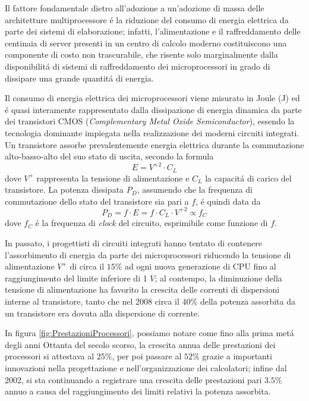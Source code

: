 Il fattore fondamentale dietro all'adozione a un'adozione di massa delle architetture multiprocessore \'e la riduzione del consumo di energia elettrica da parte dei sistemi di elaborazione; infatti, l'alimentazione e il raffreddamento delle centinaia di server presenti in un centro di calcolo moderno costituiscono una componente di costo non trascurabile, che risente solo marginalmente dalla disponibilit\'a di sistemi di raffreddamento dei microprocessori in grado di dissipare una grande quantit\'a di energia.\newline

Il consumo di energia elettrica dei microprocessori viene misurato in Joule (\si{J}) ed \'e quasi interamente rappresentato dalla dissipazione di energia dinamica da parte dei transistori CMOS (\textit{Complementary Metal Oxide Semiconductor}), essendo la tecnologia dominante impiegata nella realizzazione dei moderni circuiti integrati.
Un transistore assorbe prevalentemente energia elettrica durante la commutazione alto-basso-alto del suo stato di uscita, secondo la formula
$$
    E = V^{+2} \cdot C_{L}
$$
dove $V^{+}$ rappresenta la tensione di alimentazione e $C_{L}$ la capacit\'a di carico del transistore.\newline
La potenza dissipata $P_{D}$, assumendo che la frequenza di commutazione dello stato del transistore sia pari a $f$, \'e quindi data da
$$
    P_{D} = f \cdot E = f \cdot C_{L} \cdot V^{+2} \propto f_{C}
$$
dove $f_{C}$ \'e la frequenza di \textit{clock} del circuito, esprimibile come funzione di $f$.

In passato, i progettisti di circuiti integrati hanno tentato di contenere l'assorbimento di energia da parte dei microprocessori riducendo la tensione di alimentazione $V^{+}$ di circa il $15\%$ ad ogni nuova generazione di CPU fino al raggiungimento del limite inferiore di 1 $\si{V}$; al contempo, la diminuzione della tensione di alimentazione ha favorito la crescita delle correnti di dispersioni interne al transistore, tanto che nel 2008 circa il $40\%$ della potenza assorbita da un transistore era dovuta alla dispersione di corrente.

In figura \ref{fig:PrestazioniProcessori}, possiamo notare come fino alla prima met\'a degli anni Ottanta del secolo scorso, la crescita annua delle prestazioni dei processori si attestava al $25\%$, per poi passare al $52\%$ grazie a importanti innovazioni nella progettazione e nell'organizzazione dei calcolatori; infine dal 2002, si sta continuando a registrare una crescita delle prestazioni pari  $3.5\%$ annuo a causa del raggiungimento dei limiti relativi la potenza assorbita.


